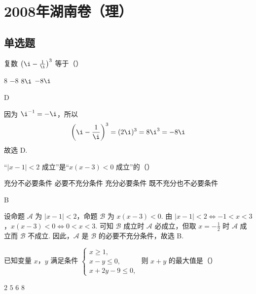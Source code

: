 \chapter{2008年湖南卷（理）}

\section{单选题}

\begin{problem}
复数 \(\left(\i - \frac{1}{\i}\right)^3\) 等于（\quad）

\choices
    {\(8\)}
    {\(-8\)}
    {\(8\i\)}
    {\(-8\i\)}
\end{problem}

\begin{answer}
D
\end{answer}

\begin{solution}
因为 \(\i^{-1}=-\i\)，所以
\[
\left(\i-\frac{1}{\i}\right)^3=(2\i)^3=8\i^3=-8\i
\]
故选 D.
\end{solution}

\begin{problem}
“\(\lvert x-1\rvert<2\) 成立”是“\(x(x-3)<0\) 成立”的（\quad）

\choices
    {充分不必要条件}
    {必要不充分条件}
    {充分必要条件}
    {既不充分也不必要条件}
\end{problem}

\begin{answer}
B
\end{answer}

\begin{solution}
设命题 \(\mathcal A\) 为 \(\lvert x-1\rvert<2\)，命题 \(\mathcal B\) 为 \(x(x-3)<0\). 由
\(\lvert x-1\rvert<2\Longleftrightarrow -1<x<3\)，\(x(x-3)<0\Longleftrightarrow 0<x<3\).
可知 \(\mathcal B\) 成立时 \(\mathcal A\) 必成立，但取 \(x=-\frac12\) 时 \(\mathcal A\) 成立而 \(\mathcal B\) 不成立. 因此，\(\mathcal A\) 是 \(\mathcal B\) 的必要不充分条件，故选 B.
\end{solution}

\begin{problem}
已知变量 \(x\)，\(y\) 满足条件 \(\begin{cases}
x \geqslant 1,\\
x - y \leqslant 0,\\
x + 2y - 9 \leqslant 0,
\end{cases}\) 则 \(x + y\) 的最大值是（\quad）

\choices
    {\(2\)}
    {\(5\)}
    {\(6\)}
    {\(8\)}
\end{problem}

